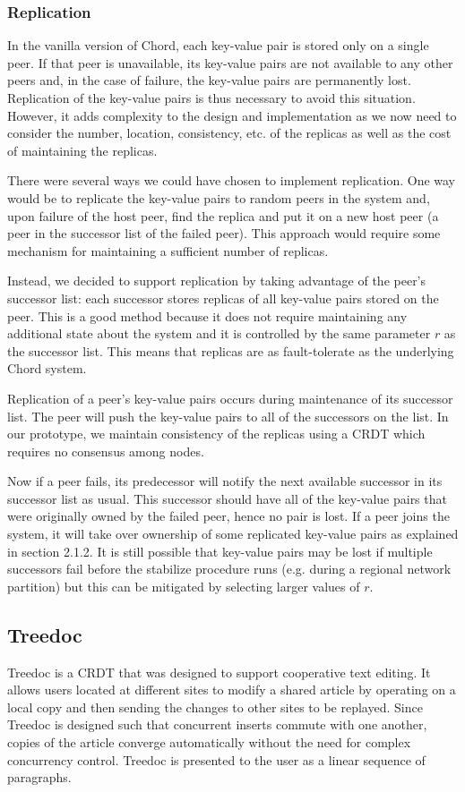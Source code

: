 \documentclass[twocolumn]{article}
\begin{document}
\subsubsection{Replication}
In the vanilla version of Chord, each key-value pair is stored only on a single peer. If that peer is unavailable, its key-value pairs are not available to any other peers and, in the case of failure, the key-value pairs are permanently lost. Replication of the key-value pairs is thus necessary to avoid this situation. However, it adds complexity to the design and implementation as we now need to consider the number, location, consistency, etc. of the replicas as well as the cost of maintaining the replicas.

There were several ways we could have chosen to implement replication. One way would be to replicate the key-value pairs to random peers in the system and, upon failure of the host peer, find the replica and put it on a new host peer (a peer in the successor list of the failed peer). This approach would require some mechanism for maintaining a sufficient number of replicas.

Instead, we decided to support replication by taking advantage of the peer's successor list: each successor stores replicas of all key-value pairs stored on the peer. This is a good method because it does not require maintaining any additional state about the system and it is controlled by the same parameter $r$ as the successor list. This means that replicas are as fault-tolerate as the underlying Chord system.

Replication of a peer's key-value pairs occurs during maintenance of its successor list. The peer will push the key-value pairs to all of the successors on the list. In our prototype, we maintain consistency of the replicas using a CRDT which requires no consensus among nodes.

Now if a peer fails, its predecessor will notify the next available successor in its successor list as usual. This successor should have all of the key-value pairs that were originally owned by the failed peer, hence no pair is lost. If a peer joins the system, it will take over ownership of some replicated key-value pairs as explained in section 2.1.2. It is still possible that key-value pairs may be lost if multiple successors fail before the stabilize procedure runs (e.g. during a regional network partition) but this can be mitigated by selecting larger values of $r$.

\subsection{Treedoc}
Treedoc is a CRDT that was designed to support cooperative text editing. It allows users located at different sites to modify a shared article by operating on a local copy and then sending the changes to other sites to be replayed. Since Treedoc is designed such that concurrent inserts commute with one another, copies of the article converge automatically without the need for complex concurrency control. Treedoc is presented to the user as a linear sequence of paragraphs.
\end{document}
